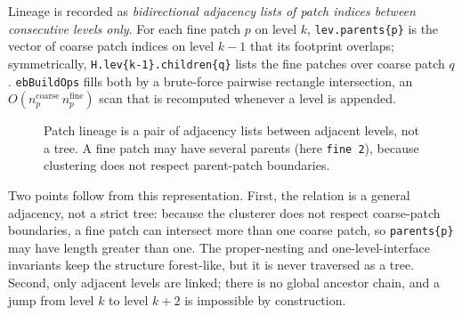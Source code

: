 \documentclass[11pt,oneside,openany]{book}
\newcommand{\code}[1]{\textnormal{\texttt{#1}}}
\begin{document}
Lineage is recorded as \emph{bidirectional adjacency lists of patch indices between consecutive levels only}. For each fine patch $p$ on level $k$, \code{lev.parents\{p\}} is the vector of coarse patch indices on level $k-1$ that its footprint overlaps; symmetrically, \code{H.lev\{k-1\}.children\{q\}} lists the fine patches over coarse patch $q$. \code{ebBuildOps} fills both by a brute-force pairwise rectangle intersection, an $O\!\left(n_p^{\text{coarse}}\,n_p^{\text{fine}}\right)$ scan that is recomputed whenever a level is appended.

\begin{figure}[htbp]
\centering
{}
\caption{Patch lineage is a pair of adjacency lists between adjacent levels, not a tree. A fine patch may have several parents (here \code{fine 2}), because clustering does not respect parent-patch boundaries.}
\label{fig:lineage}
\end{figure}


Two points follow from this representation. First, the relation is a general adjacency, not a strict tree: because the clusterer does not respect coarse-patch boundaries, a fine patch can intersect more than one coarse patch, so \code{parents\{p\}} may have length greater than one. The proper-nesting and one-level-interface invariants keep the structure forest-like, but it is never traversed as a tree. Second, only adjacent levels are linked; there is no global ancestor chain, and a jump from level $k$ to level $k+2$ is impossible by construction.
\end{document}
